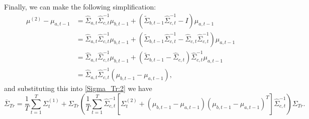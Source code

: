 \documentclass[12pt,leqno]{article}
\begin{document}
Finally, we can make the following simplification:
\begin{align*}
  \mu^{(2)} - \mu_{a,t-1} &= \widehat{\Sigma}_{a,t}\widehat{\Sigma}_{c,t}^{-1}\mu_{b,t-1} +
  (\widetilde{\Sigma}_{b,t-1}\widehat{\Sigma}_{c,t}^{-1}-I)\mu_{a,t-1}\\
  &= \widehat{\Sigma}_{a,t}\widehat{\Sigma}_{c,t}^{-1}\mu_{b,t-1} +
  (\widetilde{\Sigma}_{b,t-1}\widehat{\Sigma}_{c,t}^{-1}-\widehat{\Sigma}_{c,t}\widehat{\Sigma}_{c,t}^{-1})\mu_{a,t-1}\\
  &=  \widehat{\Sigma}_{a,t}\widehat{\Sigma}_{c,t}^{-1}\mu_{b,t-1} +
  (\widetilde{\Sigma}_{b,t-1}-\widehat{\Sigma}_{c,t})\widehat{\Sigma}_{c,t}^{-1}\mu_{a,t-1}\\
  &= \widehat{\Sigma}_{a,t}\widehat{\Sigma}_{c,t}^{-1}(\mu_{b,t-1} -\mu_{a,t-1}),
\end{align*}
and substituting this into \eqref{Sigma_Tr:2} we have
\begin{equation}\label{Sigma_Tr:3}
\overline{\Sigma}_{Tr}   =\frac{1}{T}\sum_{t=1}^T\Sigma^{(1)}_t+\Sigma_{Tr}\left(\frac{1}{T}\sum_{t=1}^T\widehat{\Sigma}_{c,t}^{-1}
   [\Sigma^{(2)}_t+(\mu_{b,t-1}-\mu_{a,t-1})(\mu_{b,t-1}-\mu_{a,t-1})^T]\widehat{\Sigma}_{c,t}^{-1}\right)\Sigma_{Tr}.
\end{equation}  
\end{document}

